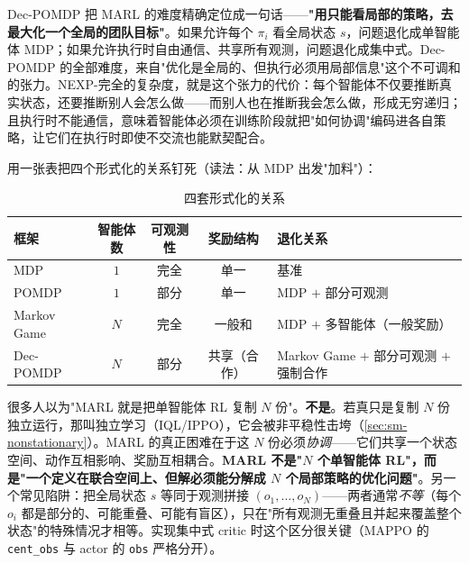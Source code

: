 \begin{insight}
Dec-POMDP 把 MARL 的难度精确定位成一句话——\textbf{"用只能看局部的策略，去最大化一个全局的团队目标"}。如果允许每个 $\pi_i$ 看全局状态 $s$，问题退化成单智能体 MDP；如果允许执行时自由通信、共享所有观测，问题退化成集中式。Dec-POMDP 的全部难度，来自"优化是全局的、但执行必须用局部信息"这个不可调和的张力。NEXP-完全的复杂度，就是这个张力的代价：每个智能体不仅要推断真实状态，还要推断别人会怎么做——而别人也在推断我会怎么做，形成无穷递归；且执行时不能通信，意味着智能体必须在训练阶段就把"如何协调"编码进各自策略，让它们在执行时即使不交流也能默契配合。
\end{insight}

用一张表把四个形式化的关系钉死（读法：从 MDP 出发"加料"）：

\begin{table}[H]\centering\small
\caption{四套形式化的关系}
\label{tab:sm-frameworks}
\begin{tabular}{lcccl}
\toprule
框架 & 智能体数 & 可观测性 & 奖励结构 & 退化关系 \\
\midrule
MDP & $1$ & 完全 & 单一 & 基准 \\
POMDP & $1$ & 部分 & 单一 & MDP $+$ 部分可观测 \\
Markov Game & $N$ & 完全 & 一般和 & MDP $+$ 多智能体（一般奖励） \\
Dec-POMDP & $N$ & 部分 & 共享（合作） & Markov Game $+$ 部分可观测 $+$ 强制合作 \\
\bottomrule
\end{tabular}
\end{table}

\begin{pitfall}
很多人以为"MARL 就是把单智能体 RL 复制 $N$ 份"。\textbf{不是}。若真只是复制 $N$ 份独立运行，那叫独立学习（IQL/IPPO），它会被非平稳性击垮（\cref{sec:sm-nonstationary}）。MARL 的真正困难在于这 $N$ 份必须\emph{协调}——它们共享一个状态空间、动作互相影响、奖励互相耦合。\textbf{MARL 不是"$N$ 个单智能体 RL"，而是"一个定义在联合空间上、但解必须能分解成 $N$ 个局部策略的优化问题"}。另一个常见陷阱：把全局状态 $s$ 等同于观测拼接 $(o_1,\dots,o_N)$——两者通常\emph{不等}（每个 $o_i$ 都是部分的、可能重叠、可能有盲区），只在"所有观测无重叠且并起来覆盖整个状态"的特殊情况才相等。实现集中式 critic 时这个区分很关键（MAPPO 的 \texttt{cent\_obs} 与 actor 的 \texttt{obs} 严格分开）。
\end{pitfall}

